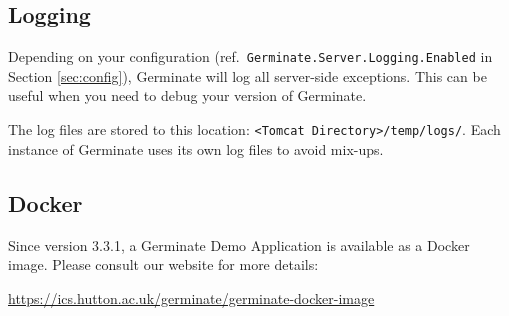 \subsection{Logging}
\label{subsection:logging}
Depending on your configuration (ref.\ \texttt{Germinate.Server.Logging.Enabled} in Section \ref{sec:config}), Germinate will log all server-side exceptions. This can be useful when you need to debug your version of Germinate.

The log files are stored to this location: \texttt{<Tomcat Directory>/temp/logs/}. Each instance of Germinate uses its own log files to avoid mix-ups.

\subsection{Docker}
Since version 3.3.1, a Germinate Demo Application is available as a Docker image. Please consult our website for more details:
\begin{center}
	\url{https://ics.hutton.ac.uk/germinate/germinate-docker-image}
\end{center}